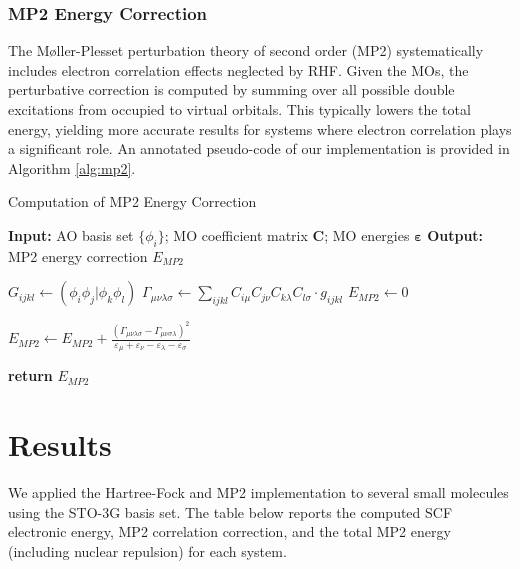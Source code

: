 \documentclass[12pt]{article}
\begin{document}
\subsubsection*{MP2 Energy Correction}

The Møller-Plesset perturbation theory of second order (MP2) systematically includes electron correlation effects neglected by RHF. Given the MOs, the perturbative correction is computed by summing over all possible double excitations from occupied to virtual orbitals. This typically lowers the total energy, yielding more accurate results for systems where electron correlation plays a significant role. An annotated pseudo-code of our implementation is provided in Algorithm \ref{alg:mp2}. 

\begin{algorithm}
    \caption{Computation of MP2 Energy Correction}
    \begin{algorithmic}[1]
        \Statex \textbf{Input:} AO basis set $\{\phi_i\}$; MO coefficient matrix $\mathbf{C}$; MO energies $\boldsymbol{\varepsilon}$
        \Statex \textbf{Output:} MP2 energy correction $E_{MP2}$

        \State $G_{ijkl} \gets (\phi_i \phi_j | \phi_k \phi_l)$ 
        \State $\Gamma_{\mu \nu \lambda \sigma} \gets \sum_{ijkl} C_{i \mu} C_{j \nu} C_{k \lambda} C_{l \sigma} \cdot g_{ijkl}$ 
        \State $E_{MP2} \gets 0$ 

                \State $E_{MP2} \gets E_{MP2} + \frac{(\Gamma_{\mu \nu \lambda \sigma} - \Gamma_{\mu \nu \sigma \lambda})^2}{\varepsilon_\mu + \varepsilon_\nu - \varepsilon_\lambda - \varepsilon_\sigma}$ 
            \EndFor
        \EndFor

        \State \textbf{return} $E_{MP2}$
    \end{algorithmic}
    \label{alg:mp2}
\end{algorithm}


\section{Results}

We applied the Hartree-Fock and MP2 implementation to several small molecules using the STO-3G basis set. The table below reports the computed SCF electronic energy, MP2 correlation correction, and the total MP2 energy (including nuclear repulsion) for each system.
\end{document}
